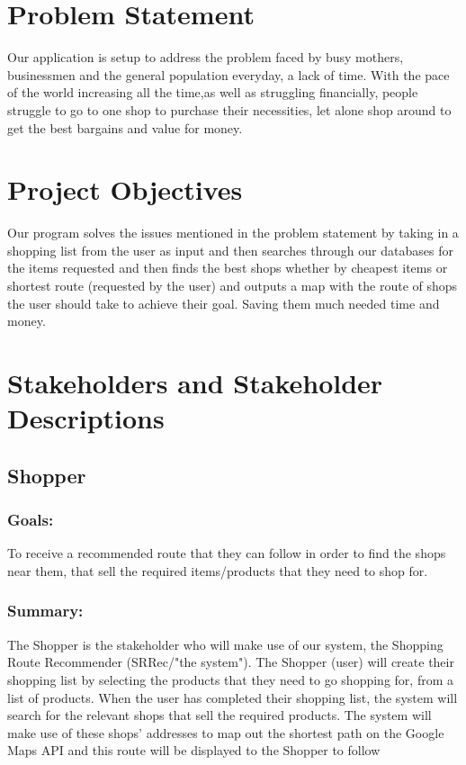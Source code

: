 \documentclass[12pt]{article}
\begin{document}
\section{Problem Statement}
Our application is setup to address the problem faced by  busy mothers, businessmen and the general population everyday, a lack of time. With the pace of the world increasing all the time,as well as struggling financially, people struggle to go to one shop to purchase their necessities, let alone shop around to get the best bargains and value for money.

\section{Project Objectives}
Our program solves the issues mentioned in the problem statement by taking in a shopping list from the user as input and then searches through our databases for the items requested and then finds the best shops whether by cheapest items or shortest route (requested by the user) and outputs a map with the route of shops the user should take to achieve their goal. Saving them much needed time and money.

\section{Stakeholders and Stakeholder Descriptions}
\subsection{Shopper}
\subsubsection{Goals:}
To receive a recommended route that they can follow in order to find the shops near them, that sell the required items/products that they need to shop for.
\subsubsection{Summary:}
The Shopper is the stakeholder who will make use of our system, the Shopping Route Recommender (SRRec/"the system"). The Shopper (user) will create their shopping list by selecting the products that they need to go shopping for, from a list of products. When the user has completed their shopping list, the system will search for the relevant shops that sell the required products. The system will make use of these shops' addresses to map out the shortest path on the Google Maps API and this route will be displayed to the Shopper to follow
\end{document}
